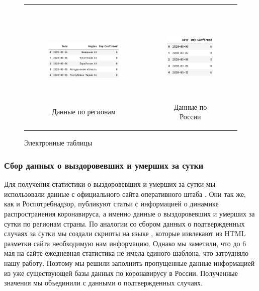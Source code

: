 \documentclass[a4paper, 12pt]{extarticle}
\begin{document}
\begin{figure}[h]
    \centering
    \begin{tabular}[c]{cc}
    \begin{subfigure}[b]{0.49\textwidth} \centering
        \includegraphics[height=130pt]{../plots/regions_df1.png}
        \caption{Данные по регионам} \label{fig:regions_df1}
    \end{subfigure}&

    \begin{subfigure}[b]{0.49\textwidth} \centering
        \includegraphics[height=130pt]{../plots/country_df1.png}
        \caption{Данные по России} \label{fig:country_df1}
    \end{subfigure}
    \end{tabular}
    \caption{Электронные таблицы} \label{fig:collection1_res}
\end{figure}

\subsubsection{Сбор данных о выздоровевших и умерших за сутки}

Для получения статистики о выздоровевших и умерших за сутки мы использовали
данные с официального сайта оперативного штаба .
Они так же, как и Роспотребнадзор, публикуют статьи с информацией о динамике
распространения коронавируса, а именно данные о выздоровевших и умерших за
сутки по регионам страны. По аналогии со сбором данных о подтвержденных случаях за сутки мы создали скрипты на языке , которые извлекают из HTML разметки сайта необходимую нам информацию. Однако мы заметили, что до 6 мая на сайте  ежедневная статистика не имела единого шаблона, что затрудняло нашу работу. Поэтому мы решили заполнить пропущенные данные информацией из уже существующей базы данных по коронавирусу в России. Полученные значения мы объединили с данными о подтвержденных случаях. 
\end{document}
